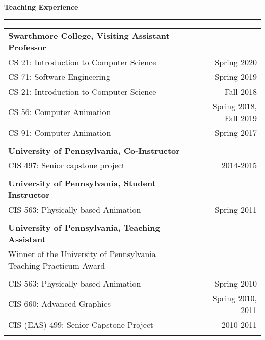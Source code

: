 \needspace{6em}
{\large {\bf Teaching Experience}}
\vspace{0.1cm}
\hrule
\begin{tabular*}{7.1in}{@{}l@{\extracolsep\fill}r}

{\bf Swarthmore College, Visiting Assistant Professor} & \\
CS 21: Introduction to Computer Science & Spring 2020\\
CS 71: Software Engineering & Spring 2019\\
CS 21: Introduction to Computer Science & Fall 2018\\
CS 56: Computer Animation & Spring 2018, Fall 2019\\
CS 91: Computer Animation & Spring 2017\\
\phantom{yommomma} & \phantom{2002}\\

{\bf University of Pennsylvania, Co-Instructor} & \\
CIS 497: Senior capstone project & 2014-2015\\
\phantom{yommomma} & \phantom{2002}\\

{\bf University of Pennsylvania, Student Instructor} & \\
CIS 563: Physically-based Animation & Spring 2011\\
\phantom{yommomma} & \phantom{2002}\\
{\bf University of Pennsylvania, Teaching Assistant} & \\
Winner of the University of Pennsylvania Teaching Practicum Award & \\
\phantom{yommomma} & \phantom{2002}\\
CIS 563: Physically-based Animation & Spring 2010\\
CIS 660: Advanced Graphics & Spring 2010, 2011\\
CIS (EAS) 499: Senior Capstone Project  & 2010-2011\\
\phantom{yommomma} & \phantom{2002}\\
\end{tabular*}


